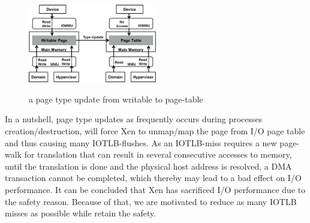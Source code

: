 \begin{figure}[ht]
\centering
\includegraphics[width=0.5\textwidth]{image/translation/wr2pt.png} \\
\caption{a page type update from writable to page-table}
\label{fig:wr2pt}
\end{figure}

In a nutshell, page type updates as frequently occurs during processes creation/destruction, will force Xen to unmap/map the page from I/O page table and thus causing many IOTLB-flushes. As an IOTLB-miss requires a new page-walk for translation that can result in several consecutive accesses to memory, until the translation is done and the physical host address is resolved, a DMA transaction cannot be completed, which thereby may lead to a bad effect on I/O performance. It can be concluded that Xen has sacrificed I/O performance due to the safety reason. Because of that, we are motivated to reduce as many IOTLB misses as possible while retain the safety.
